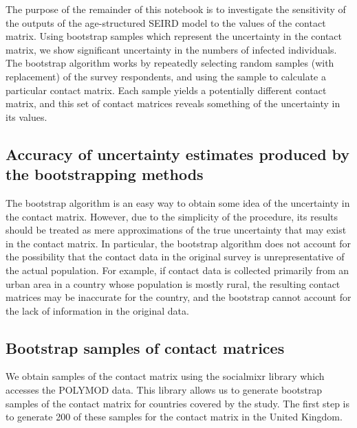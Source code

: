 \documentclass[
]{article}
\begin{document}
The purpose of the remainder of this notebook is to investigate the
sensitivity of the outputs of the age-structured SEIRD model to the
values of the contact matrix. Using bootstrap samples which represent
the uncertainty in the contact matrix, we show significant uncertainty
in the numbers of infected individuals. The bootstrap algorithm works by
repeatedly selecting random samples (with replacement) of the survey
respondents, and using the sample to calculate a particular contact
matrix. Each sample yields a potentially different contact matrix, and
this set of contact matrices reveals something of the uncertainty in its
values.

\hypertarget{accuracy-of-uncertainty-estimates-produced-by-the-bootstrapping-methods}{%
\subsection{Accuracy of uncertainty estimates produced by the
bootstrapping
methods}\label{accuracy-of-uncertainty-estimates-produced-by-the-bootstrapping-methods}}

The bootstrap algorithm is an easy way to obtain some idea of the
uncertainty in the contact matrix. However, due to the simplicity of the
procedure, its results should be treated as mere approximations of the
true uncertainty that may exist in the contact matrix. In particular,
the bootstrap algorithm does not account for the possibility that the
contact data in the original survey is unrepresentative of the actual
population. For example, if contact data is collected primarily from an
urban area in a country whose population is mostly rural, the resulting
contact matrices may be inaccurate for the country, and the bootstrap
cannot account for the lack of information in the original data.

\hypertarget{bootstrap-samples-of-contact-matrices}{%
\subsection{Bootstrap samples of contact
matrices}\label{bootstrap-samples-of-contact-matrices}}

We obtain samples of the contact matrix using the socialmixr library
which accesses the POLYMOD data. This library allows us to generate
bootstrap samples of the contact matrix for countries covered by the
study. The first step is to generate 200 of these samples for the
contact matrix in the United Kingdom.
\end{document}
